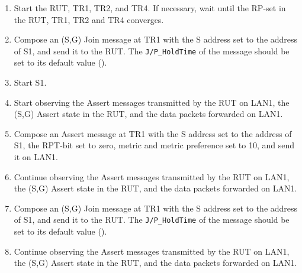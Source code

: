 \documentclass[11pt]{report}
\begin{document}
\begin{enumerate}

  \item Start the RUT, TR1, TR2, and TR4. If necessary, wait until the RP-set
  in the RUT, TR1, TR2 and TR4 converges.

  \item Compose an (S,G) Join message at TR1 with the S address set to the
  address of S1, and send it to the RUT.
  The \verb=J/P_HoldTime= of the message should be set to its default
  value ({\PimsmJPHoldTime}).

  \item Start S1.

  \item Start observing the Assert messages transmitted by the RUT on
  LAN1, the (S,G) Assert state in the RUT, and the data packets forwarded on
  LAN1. 

  \item Compose an Assert message at TR1 with the S address set to the
  address of S1, the RPT-bit set to zero, metric and metric preference set to
  10, and send it on LAN1.

  \item Continue observing the Assert messages transmitted by the RUT on
  LAN1, the (S,G) Assert state in the RUT, and the data packets forwarded on
  LAN1.

  \item Compose an (S,G) Join message at TR1 with the S address set to the
  address of S1, and send it to the RUT.
  The \verb=J/P_HoldTime= of the message should be set to its default
  value ({\PimsmJPHoldTime}).

  \item Continue observing the Assert messages transmitted by the RUT on
  LAN1, the (S,G) Assert state in the RUT, and the data packets forwarded on
  LAN1.

\end{enumerate}



\end{document}
